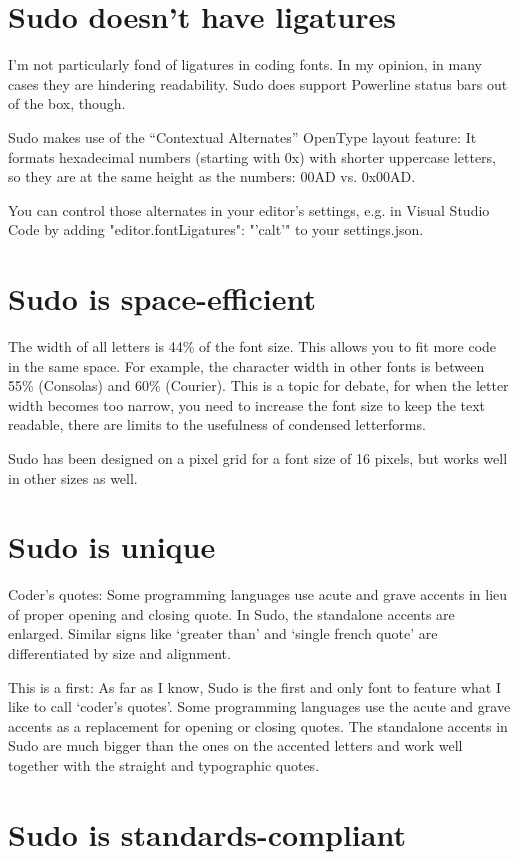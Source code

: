 \documentclass[paper=a4, 12pt]{scrbook}
\begin{document}
\section{Sudo doesn’t have ligatures}
I’m not particularly fond of ligatures in coding fonts. In my opinion, in many cases they are hindering readability. Sudo does support Powerline status bars out of the box, though.

Sudo makes use of the “Contextual Alternates” OpenType layout feature: It formats hexadecimal numbers (starting with 0x) with shorter uppercase letters, so they are at the same height as the numbers: 00AD vs. 0x00AD.

You can control those alternates in your editor’s settings, e.g. in Visual Studio Code by adding "editor.fontLigatures": "'calt'" to your settings.json.

\section{Sudo is space-efficient}

The width of all letters is 44\% of the font size. This allows you to fit more code in the same space. For example, the character width in other fonts is between 55\% (Consolas) and 60\% (Courier). This is a topic for debate, for when the letter width becomes too narrow, you need to increase the font size to keep the text readable, there are limits to the usefulness of condensed letterforms.

Sudo has been designed on a pixel grid for a font size of 16 pixels, but works well in other sizes as well.

\section{Sudo is unique}
Coder’s quotes: Some programming languages use acute and grave accents in lieu of proper opening and closing quote. In Sudo, the standalone accents are enlarged. Similar signs like ‘greater than’ and ‘single french quote’ are differentiated by size and alignment.

This is a first: As far as I know, Sudo is the first and only font to feature what I like to call ‘coder’s quotes’. Some programming languages use the acute and grave accents as a replacement for opening or closing quotes. The standalone accents in Sudo are much bigger than the ones on the accented letters and work well together with the straight and typographic quotes.

\section{Sudo is standards-compliant}
\end{document}
